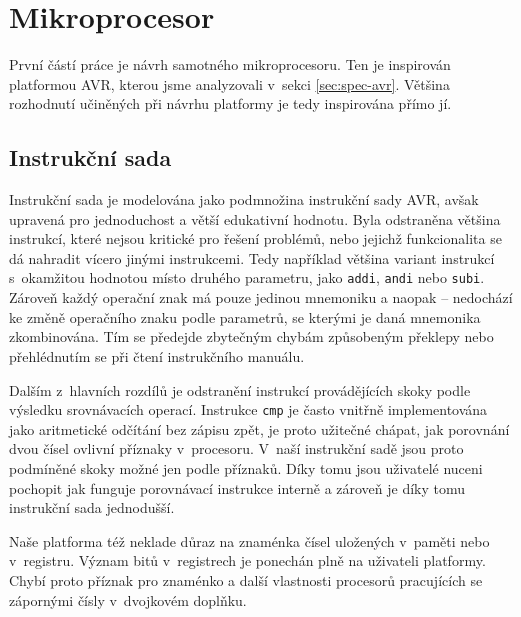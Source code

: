 \chapter{Mikroprocesor}

První částí práce je návrh samotného mikroprocesoru. Ten je inspirován platformou AVR, kterou jsme analyzovali v~sekci \ref{sec:spec-avr}. Většina rozhodnutí učiněných při návrhu platformy je tedy inspirována přímo jí.

\section{Instrukční sada}

Instrukční sada je modelována jako podmnožina instrukční sady AVR, avšak upravená pro jednoduchost a větší edukativní hodnotu. Byla odstraněna většina instrukcí, které nejsou kritické pro řešení problémů, nebo jejichž funkcionalita se dá nahradit vícero jinými instrukcemi. Tedy například většina variant instrukcí s~okamžitou hodnotou místo druhého parametru, jako \texttt{addi}, \texttt{andi} nebo \texttt{subi}. Zároveň každý operační znak má pouze jedinou mnemoniku a naopak -- nedochází ke změně operačního znaku podle parametrů, se kterými je daná mnemonika zkombinována. Tím se předejde zbytečným chybám způsobeným překlepy nebo přehlédnutím se při čtení instrukčního manuálu.

Dalším z~hlavních rozdílů je odstranění instrukcí provádějících skoky podle výsledku srovnávacích operací. Instrukce \texttt{cmp} je často vnitřně implementována jako aritmetické odčítání bez zápisu zpět, je proto užitečné chápat, jak porovnání dvou čísel ovlivní příznaky v~procesoru. V~naší instrukční sadě jsou proto podmíněné skoky možné jen podle příznaků. Díky tomu jsou uživatelé nuceni pochopit jak funguje porovnávací instrukce interně a zároveň je díky tomu instrukční sada jednodušší.

Naše platforma též neklade důraz na znaménka čísel uložených v~paměti nebo v~registru. Význam bitů v~registrech je ponechán plně na uživateli platformy. Chybí proto příznak pro znaménko a další vlastnosti procesorů pracujících se zápornými čísly v~dvojkovém doplňku.

